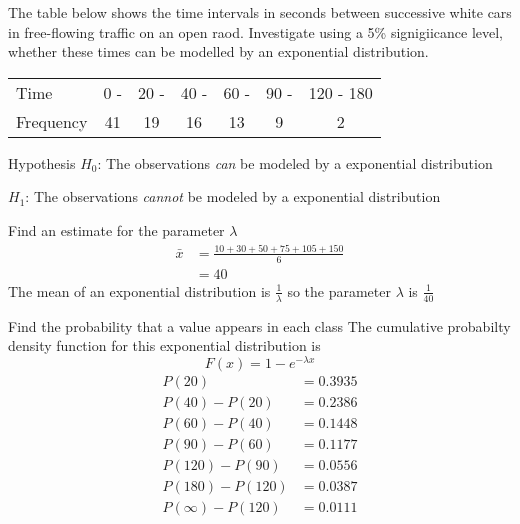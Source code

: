         \begin{example}
        {
            The table below shows the time intervals in seconds between successive white cars in free-flowing traffic on an open raod. Investigate using a 5\% signigiicance level, whether these times can be modelled by an exponential distribution.

            \begin{center}
            \begin{tabular}{l|c|c|c|c|c|c}
            Time & 0 - & 20 - & 40 - & 60 - & 90 - & 120 - 180 \\
            Frequency & 41 & 19 & 16 & 13 & 9 & 2 \\
            \end{tabular}
            \end{center}
        }

        \begin{step}{Hypothesis}
        $H_0$: The observations \textit{can} be modeled by a exponential distribution

        $H_1$: The observations \textit{cannot} be modeled by a exponential distribution
        \end{step}

        \begin{step}{Find an estimate for the parameter $\lambda$}
            \begin{align*}
            \bar{x} &= \frac{10 + 30 + 50 + 75 + 105 + 150}{6}\\
                    &= 40
            \end{align*}
            The mean of an exponential distribution is $\displaystyle\frac{1}{\lambda}$ so the parameter $\lambda$ is $\displaystyle\frac{1}{40}$
        \end{step}

        \begin{step}{Find the probability that a value appears in each class}
            The cumulative probabilty density function for this exponential distribution is
            $$
            F(x) = 1 - e^{-\lambda x}
            $$
            \begin{align*}
            P(20) &= 0.3935 \\
            P(40) - P(20) &= 0.2386 \\
            P(60) - P(40) &= 0.1448 \\
            P(90) - P(60) &= 0.1177 \\
            P(120) - P(90) &= 0.0556 \\
            P(180) - P(120) &= 0.0387 \\
            P(\infty) - P(120) &= 0.0111 \\
            \end{align*}
        \end{step}


\end{example}
